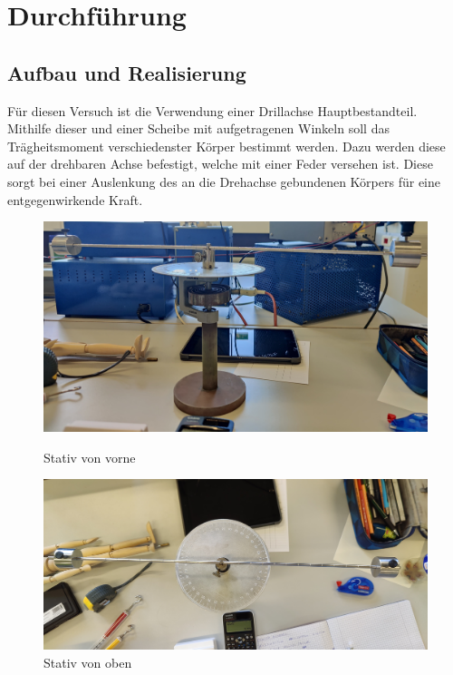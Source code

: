 \section{Durchführung}
\label{sec:Durchführung}

\subsection{Aufbau und Realisierung}
\label{sec:Aufbau und Realisierung}
Für diesen Versuch ist die Verwendung einer Drillachse Hauptbestandteil.
Mithilfe dieser und einer Scheibe mit aufgetragenen Winkeln soll das
Trägheitsmoment verschiedenster Körper bestimmt werden. Dazu werden diese
auf der drehbaren Achse befestigt, welche mit einer Feder versehen ist.
Diese sorgt bei einer Auslenkung des
an die Drehachse gebundenen Körpers für eine entgegenwirkende Kraft.
\begin{figure}[h]
    \centering
    \begin{minipage}{0.45\textwidth}
        \centering
        \includegraphics[width=\textwidth]{Bilder/abb1.jpg}
        \caption{Stativ von vorne}
    \end{minipage}
    \hfill
    \begin{minipage}{0.45\textwidth}
        \centering
        \includegraphics[width=\textwidth]{Bilder/abb2.jpg}
        \caption{Stativ von oben}
    \end{minipage}
\end{figure}
